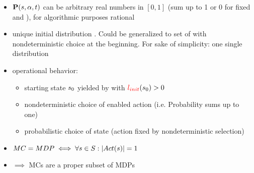 \documentclass[preview]{standalone}
\begin{document}
\begin{itemize}
	\item ${\textbf{P}}({s}, {\alpha}, t)$ can be arbitrary real numbers in $[0,1]$ (sum up to 1 or 0 for fixed \state and \action), for algorithmic purposes rational
	\item unique initial distribution \initdist. Could be generalized to set of \initdist with nondeterministic choice at the beginning. For sake of simplicity: one single distribution
	\item operational behavior:
	\begin{itemize}
		\item starting state ${s}_0$ yielded by \initdist with ${\color{red}{l_{init}}}({s}_0) > 0$
		\item nondeterministic choice of enabled action (i.e. Probability sums up to one)
		\item probabilistic choice of state (action fixed by nondeterministic selection)
	\end{itemize}
	
	\item $MC = MDP \iff \forall {s} \in {S} : |{Act}({s})| = 1$
	
	\item $\implies$ MCs are a proper subset of MDPs
	
\end{itemize}

	
\end{document}
